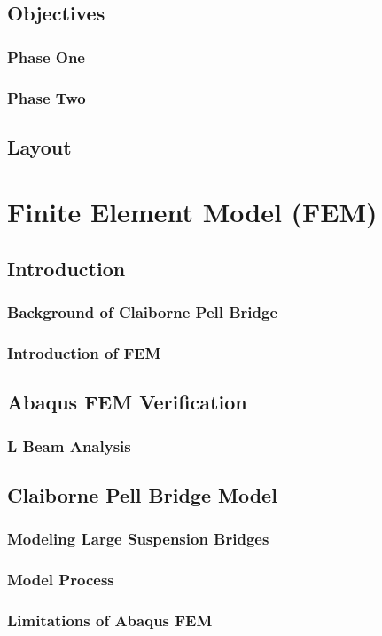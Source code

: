 \documentclass[12pt]{report}
\begin{document}
	\section{Objectives}
		\subsection{Phase One}
		\subsection{Phase Two}
	\section{Layout}
\chapter{Finite Element Model (FEM)}
	\section{Introduction}
		\subsection{Background of Claiborne Pell Bridge}
		\subsection{Introduction of FEM}
	\section{Abaqus FEM Verification}
		\subsection{L Beam Analysis}
	\section{Claiborne Pell Bridge Model}
		\subsection{Modeling Large Suspension Bridges}
		\subsection{Model Process}
		\subsection{Limitations of Abaqus FEM}
\end{document}
